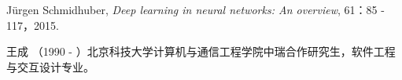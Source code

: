 \documentclass[10pt,journal,compsoc]{IEEEtran}
\begin{document}
\ifCLASSOPTIONcaptionsoff
  \newpage
\fi

\begin{thebibliography}{1}

Jürgen Schmidhuber, \emph{Deep learning in neural networks: An overview}, 61：85 - 117，2015.

\end{thebibliography}


\begin{IEEEbiography}{王成}
（1990 - ）北京科技大学计算机与通信工程学院中瑞合作研究生，软件工程与交互设计专业。
\end{IEEEbiography}
\end{document}
